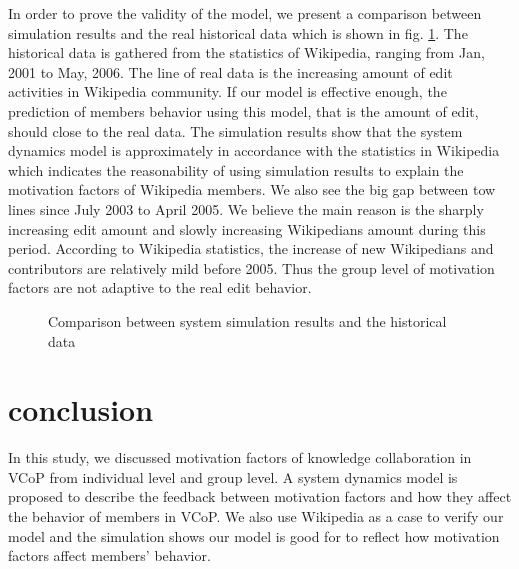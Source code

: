 \documentclass[doublespacing]{elsarticle}
\begin{document}
In order to prove the validity of the model, we present a comparison
between simulation results and the real historical data  which is
shown in fig. \ref{fig:comparison}. The historical data is gathered
from the statistics of Wikipedia, ranging from Jan, 2001 to May,
2006. The line of real data  is the increasing amount of edit activities
in Wikipedia community. If our model is effective enough, the
prediction of members behavior using this model, that is the amount of
edit, should close to the real data.  
The simulation results show that the system dynamics model is
approximately in accordance with the statistics in Wikipedia which
indicates the reasonability of using simulation results to explain the
motivation factors of Wikipedia members. We also see the big gap
between tow lines since July 2003 to April 2005. We believe the main
reason is  the sharply increasing edit amount and slowly
increasing Wikipedians amount during this period. According to Wikipedia
statistics\cite{wikistaten}, the increase of new Wikipedians and
contributors are relatively mild before 2005. Thus the group level of motivation
factors are not adaptive to the real edit behavior.   

\begin{figure}[htpb]
  \centering

  \caption{Comparison between system simulation results and the historical data }
\label{fig:comparison}
\end{figure}

\section{conclusion}
\label{sec:conclusion}

 In this study, we discussed motivation factors of knowledge
 collaboration in VCoP from individual level and group level. A system
 dynamics model is proposed to describe the feedback between motivation
 factors and how they affect the behavior of members in VCoP. We also
 use Wikipedia as a case to verify our model and the simulation shows
 our model is good for to reflect how motivation factors affect members' behavior.
\end{document}
